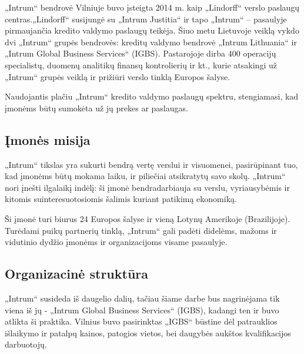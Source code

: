 \documentclass{VUMIFPSkursinis}
\begin{document}
„Intrum“ bendrovė Vilniuje buvo įsteigta 2014 m. kaip „Lindorff“ verslo paslaugų centras.„Lindorff“ susijungė su „Intrum Justitia“ ir tapo „Intrum“ – pasaulyje pirmaujančia kredito valdymo paslaugų teikėja. Šiuo metu Lietuvoje veiklą vykdo dvi „Intrum“ grupės bendrovės: kreditų valdymo bendrovė „Intrum Lithuania“ ir „Intrum Global Business Services“ (IGBS). Pastarojoje dirba 400 operacijų specialistų, duomenų analitikų finansų kontrolierių ir kt., kurie atsakingi už „Intrum“ grupės veiklą ir prižiūri verslo tinklą Europos šalyse.\cite{IntrumGBS}

Naudojantis plačiu „Intrum“ kredito valdymo paslaugų spektru, stengiamasi, kad įmonėms būtų sumokėta už jų prekes ar paslaugas.

\subsection{Įmonės misija}
„Intrum“ tikslas yra sukurti bendrą vertę verslui ir visuomenei, pasirūpinant tuo, kad įmonėms būtų mokama laiku, ir piliečiai atsikratytų savo skolų. „Intrum“ nori įnešti ilgalaikį indėlį: ši įmonė bendradarbiauja su verslu, vyriausybėmis ir kitomis suinteresuotosiomis šalimis kuriant patikimą ekonomiką.

Ši įmonė turi biurus 24 Europos šalyse ir vieną Lotynų Amerikoje (Brazilijoje). Turėdami puikų partnerių tinklą, „Intrum“ gali padėti didelėms,  mažoms ir vidutinio dydžio įmonėms ir organizacijoms visame pasaulyje. 

\subsection{Organizacinė struktūra}
„Intrum“ susideda iš daugelio dalių, tačiau šiame darbe bus nagrinėjama tik viena iš jų - „Intrum Global Business Services“ (IGBS), kadangi ten ir buvo atlikta ši praktika. Vilnius buvo pasirinktas „IGBS“ būstine dėl patrauklios išlaikymo ir patalpų kainos, patogios vietos, bei daugybės aukštos kvalifikacijos darbuotojų.
\end{document}
